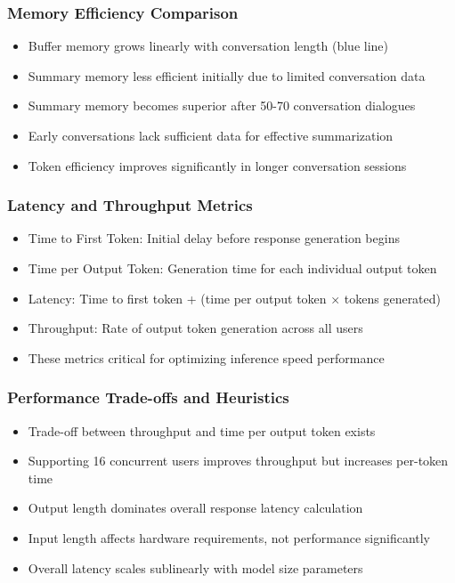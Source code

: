 \begin{frame}[fragile]\frametitle{Memory Efficiency Comparison}
      \begin{itemize}
	\item Buffer memory grows linearly with conversation length (blue line)
	\item Summary memory less efficient initially due to limited conversation data
	\item Summary memory becomes superior after 50-70 conversation dialogues
	\item Early conversations lack sufficient data for effective summarization
	\item Token efficiency improves significantly in longer conversation sessions
	  \end{itemize}
\end{frame}

\begin{frame}[fragile]\frametitle{Latency and Throughput Metrics}
      \begin{itemize}
	\item Time to First Token: Initial delay before response generation begins
	\item Time per Output Token: Generation time for each individual output token
	\item Latency: Time to first token + (time per output token × tokens generated)
	\item Throughput: Rate of output token generation across all users
	\item These metrics critical for optimizing inference speed performance
	  \end{itemize}
\end{frame}

\begin{frame}[fragile]\frametitle{Performance Trade-offs and Heuristics}
      \begin{itemize}
	\item Trade-off between throughput and time per output token exists
	\item Supporting 16 concurrent users improves throughput but increases per-token time
	\item Output length dominates overall response latency calculation
	\item Input length affects hardware requirements, not performance significantly
	\item Overall latency scales sublinearly with model size parameters
	  \end{itemize}
\end{frame}

